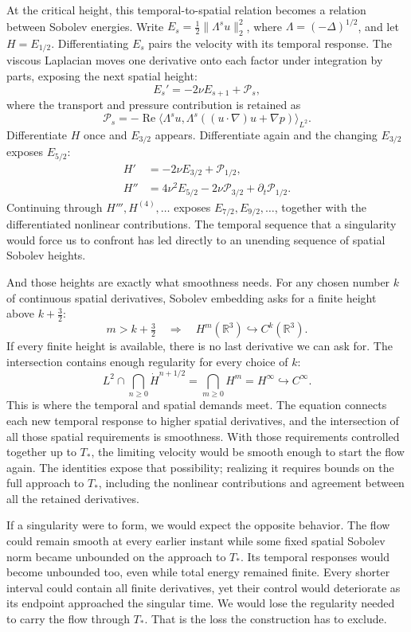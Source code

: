 At the critical height, this temporal-to-spatial relation becomes a relation
between Sobolev energies. Write
\(E_s=\tfrac12\|\Lambda^su\|_2^2\), where
\(\Lambda=(-\Delta)^{1/2}\), and let \(H=E_{1/2}\).
Differentiating \(E_s\) pairs the velocity with its temporal response.
The viscous Laplacian moves one derivative onto each factor under integration
by parts, exposing the next spatial height:
\[
 E_s'=-2\nu E_{s+1}+\mathcal P_s,
\]
where the transport and pressure contribution is retained as
\[
 \mathcal P_s=-\operatorname{Re}\langle\Lambda^su,
 \Lambda^s((u\cdot\nabla)u+\nabla p)\rangle_{L^2}.
\]
Differentiate \(H\) once and \(E_{3/2}\) appears. Differentiate again
and the changing \(E_{3/2}\) exposes \(E_{5/2}\):
\[
 \begin{aligned}
 H'&=-2\nu E_{3/2}+\mathcal P_{1/2},\\
 H''&=4\nu^2E_{5/2}-2\nu\mathcal P_{3/2}
       +\partial_t\mathcal P_{1/2}.
 \end{aligned}
\]
Continuing through \(H''',H^{(4)},\ldots\) exposes
\(E_{7/2},E_{9/2},\ldots\), together with the differentiated nonlinear
contributions. The temporal sequence that a singularity would force us
to confront has led directly to an unending sequence of spatial Sobolev
heights.

And those heights are exactly what smoothness needs. For any chosen number
\(k\) of continuous spatial derivatives, Sobolev embedding asks for a
finite height above \(k+\tfrac32\):
\[
 m>k+\tfrac32
 \quad\Longrightarrow\quad H^m(\mathbb R^3)\hookrightarrow C^k(\mathbb R^3).
\]
If every finite height is available, there is no last derivative we can
ask for. The intersection contains enough regularity for every choice of
\(k\):
\[
 L^2\cap\bigcap_{n\ge0}\dot H^{n+1/2}
 =\bigcap_{m\ge0}H^m
 =H^\infty\hookrightarrow C^\infty.
\]
This is where the temporal and spatial demands meet. The equation connects
each new temporal response to higher spatial derivatives, and the
intersection of all those spatial requirements is smoothness. With those
requirements controlled together up to \(T_*\), the limiting velocity
would be smooth enough to start the flow again. The identities expose
that possibility; realizing it requires bounds on the full approach to
\(T_*\), including the nonlinear contributions and agreement between
all the retained derivatives.

If a singularity were to form, we would expect the opposite behavior.
The flow could remain smooth at every earlier instant while some fixed
spatial Sobolev norm became unbounded on the approach to \(T_*\).
Its temporal responses would become unbounded too, even while total
energy remained finite. Every shorter interval could contain all finite
derivatives, yet their control would deteriorate as its endpoint approached
the singular time. We would lose the regularity needed to carry the flow
through \(T_*\). That is the loss the construction has to exclude.

